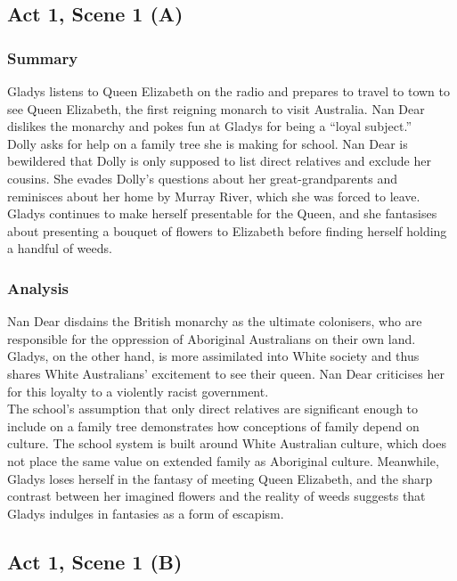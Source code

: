 \documentclass[a4paper]{article}
\begin{document}
\subsection{Act 1, Scene 1 (A)}
\subsubsection{Summary}
Gladys listens to Queen Elizabeth on the radio and prepares to
travel to town to see Queen Elizabeth, the first reigning
monarch to visit Australia. Nan Dear dislikes the monarchy and
pokes fun at Gladys for being a “loyal subject.”\\

Dolly asks for help on a family tree she is making for school.
Nan Dear is bewildered that Dolly is only supposed to list
direct relatives and exclude her cousins. She evades Dolly’s
questions about her great-grandparents and reminisces about
her home by Murray River, which she was forced to leave.
Gladys continues to make herself presentable for the Queen,
and she fantasises about presenting a bouquet of flowers to
Elizabeth before finding herself holding a handful of weeds.\\

\subsubsection{Analysis}
Nan Dear disdains the British monarchy as the ultimate colonisers,
who are responsible for the oppression of Aboriginal Australians on
their own land. Gladys, on the other hand, is more assimilated into
White society and thus shares White Australians’ excitement to see
their queen. Nan Dear criticises her for this loyalty to a violently
racist government.\\

The school’s assumption that only direct relatives are significant
enough to include on a family tree demonstrates how conceptions
of family depend on culture. The school system is built around
White Australian culture, which does not place the same value on
extended family as Aboriginal culture. Meanwhile, Gladys loses
herself in the fantasy of meeting Queen Elizabeth, and the sharp
contrast between her imagined flowers and the reality of weeds
suggests that Gladys indulges in fantasies as a form of escapism.\\

\subsection{Act 1, Scene 1 (B)}
\end{document}
